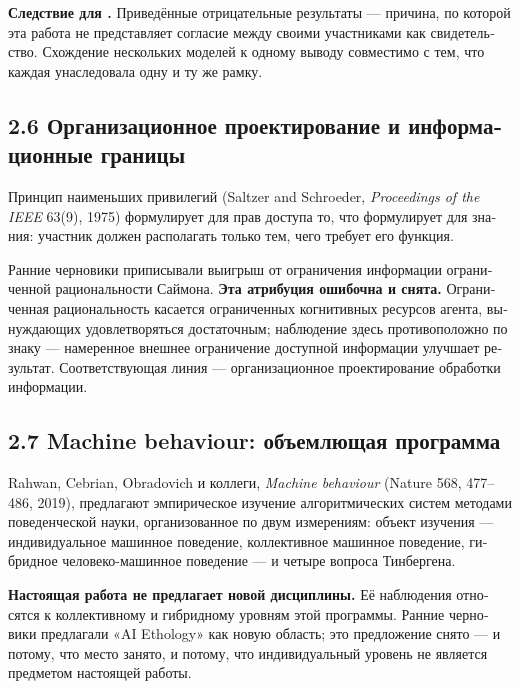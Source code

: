 \begin{russian}
\textbf{Следствие для .} Приведённые отрицательные результаты — причина, по которой эта работа не представляет согласие между своими участниками как свидетельство. Схождение нескольких моделей к одному выводу совместимо с тем, что каждая унаследовала одну и ту же рамку.


\subsection*{2.6 Организационное проектирование и информационные границы}
\label{sec:ru:2.6}

\gcheck{} Принцип наименьших привилегий (Saltzer and Schroeder, \emph{Proceedings of the IEEE} 63(9), 1975) формулирует для прав доступа то, что  формулирует для знания: участник должен располагать только тем, чего требует его функция.

Ранние черновики приписывали выигрыш от ограничения информации ограниченной рациональности Саймона. \textbf{Эта атрибуция ошибочна и снята.} Ограниченная рациональность касается ограниченных когнитивных ресурсов агента, вынуждающих удовлетворяться достаточным; наблюдение здесь противоположно по знаку — намеренное внешнее ограничение доступной информации улучшает результат. Соответствующая линия — организационное проектирование обработки информации.


\subsection*{2.7 Machine behaviour: объемлющая программа}
\label{sec:ru:2.7}

\gcheck{} Rahwan, Cebrian, Obradovich и коллеги, \emph{Machine behaviour} (Nature 568, 477–486, 2019), предлагают эмпирическое изучение алгоритмических систем методами поведенческой науки, организованное по двум измерениям: объект изучения — индивидуальное машинное поведение, коллективное машинное поведение, гибридное человеко-машинное поведение — и четыре вопроса Тинбергена.

\textbf{Настоящая работа не предлагает новой дисциплины.} Её наблюдения относятся к коллективному и гибридному уровням этой программы. Ранние черновики предлагали «AI Ethology» как новую область; это предложение снято — и потому, что место занято, и потому, что индивидуальный уровень не является предметом настоящей работы.



\end{russian}
